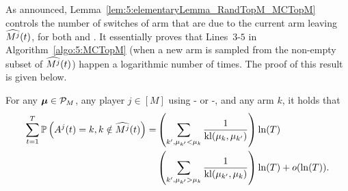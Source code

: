 

As announced, Lemma~\ref{lem:5:elementaryLemma_RandTopM_MCTopM} controls
the number of switches of arm that are due to the current arm leaving $\widehat{M^j}(t)$,
for both \RandTopM{} and \MCTopM{}. It essentially proves that Lines~$3$-$5$ in Algorithm~\ref{algo:5:MCTopM} (when a new arm is sampled from the non-empty subset of $\widehat{M^j}(t)$)
happen a logarithmic number of times. The proof of this result is given below.

\begin{lemma}\label{lem:5:elementaryLemma_RandTopM_MCTopM}
\begin{leftbar}[lemmabar]  %
  For any $\boldsymbol{\mu}\in\mathcal{P}_M$,
  any player $j \in [M]$ using
  \RandTopM- or \MCTopM-\klUCB,
  and any arm $k$,
  it holds that
  \begin{align}
    \sum_{t=1}^T \mathbb{P}\left(A^j(t)=k, k\notin \widehat{M^j}(t)\right) =
    & \left( \sum_{k', \mu_{k'} < \mu_k}\frac{1}{\mathrm{kl}(\mu_k,\mu_{k'})} \right) \ln(T) \nonumber\\
    & \left( \sum_{k', \mu_{k'} > \mu_k}\frac{1}{\mathrm{kl}(\mu_{k'},\mu_{k})}\right ) \ln(T)
    + o(\ln(T)).
  \end{align}
\end{leftbar}  %
\end{lemma}


